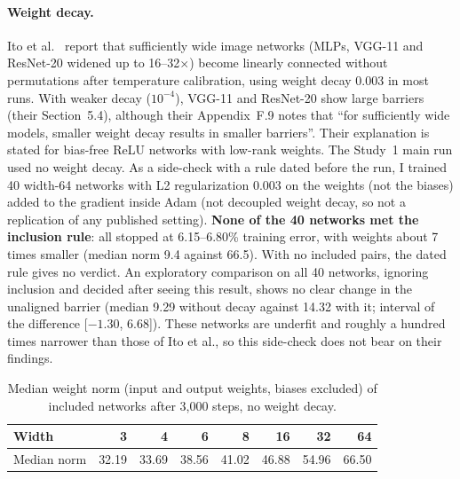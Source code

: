 \documentclass[11pt]{article}
\begin{document}
\paragraph{Weight decay.} Ito et al.~\cite{ito2026permutations} report that sufficiently wide image networks (MLPs, VGG-11 and ResNet-20 widened up to 16--32$\times$) become linearly connected without permutations after temperature calibration, using weight decay 0.003 in most runs. With weaker decay ($10^{-4}$), VGG-11 and ResNet-20 show large barriers (their Section~5.4), although their Appendix~F.9 notes that ``for sufficiently wide models, smaller weight decay results in smaller barriers''. Their explanation is stated for bias-free ReLU networks with low-rank weights. The Study~1 main run used no weight decay. As a side-check with a rule dated before the run, I trained 40 width-64 networks with L2 regularization 0.003 on the weights (not the biases) added to the gradient inside Adam (not decoupled weight decay, so not a replication of any published setting). \textbf{None of the 40 networks met the inclusion rule}: all stopped at 6.15--6.80\% training error, with weights about 7 times smaller (median norm 9.4 against 66.5). With no included pairs, the dated rule gives no verdict. An exploratory comparison on all 40 networks, ignoring inclusion and decided after seeing this result, shows no clear change in the unaligned barrier (median 9.29 without decay against 14.32 with it; interval of the difference [$-1.30$, 6.68]). These networks are underfit and roughly a hundred times narrower than those of Ito et al., so this side-check does not bear on their findings.

\label{app:b4}

\begin{table}[H]
\centering
\small
\caption{Median weight norm (input and output weights, biases excluded) of included networks after 3{,}000 steps, no weight decay.}
\begin{tabular}{@{}lrrrrrrr@{}}
\toprule
Width & 3 & 4 & 6 & 8 & 16 & 32 & 64 \\
\midrule
Median norm & 32.19 & 33.69 & 38.56 & 41.02 & 46.88 & 54.96 & 66.50 \\
\bottomrule
\end{tabular}
\end{table}
\end{document}
